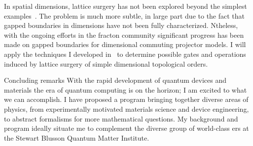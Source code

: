 In  spatial dimensions, lattice surgery has not been explored beyond the simplest examples~\cite{Vasmer2019}.
The problem is much more subtle, in large part due to the fact that gapped boundaries in  dimensions have not been fully characterized.
Ntheless, with the ongoing efforts in the fracton community significant progress has been made on gapped boundaries for  dimensional commuting projector models.
I will apply the techniques I developed in~\cite{Aasen2020defect} to determine possible gates and operations induced by lattice surgery of simple  dimensional topological orders.






{Concluding remarks}
{With the rapid development of quantum devices and materials the era of quantum computing is on the horizon; I am excited to  what we can accomplish. I have proposed a  program bringing together diverse areas of physics, from experimentally motivated materials science and device engineering, to abstract formalisms for more mathematical questions. My background and  program ideally situate me to complement the diverse group of world-class ers at the Stewart Blusson Quantum Matter Institute.
}